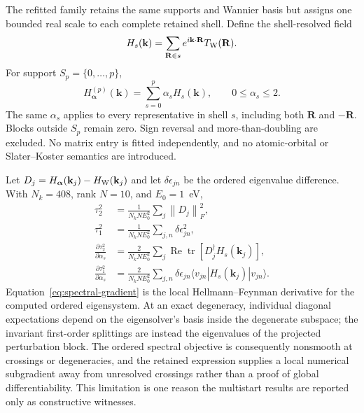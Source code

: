 \documentclass[11pt]{article}
\theoremstyle{definition}
\newcommand{\norm}[1]{\left\lVert#1\right\rVert}
\newcommand{\kvec}{\mathbf k}
\newcommand{\Rvec}{\mathbf R}
\begin{document}
The refitted family retains the same supports and Wannier basis but assigns one bounded
real scale to each complete retained shell.  Define the shell-resolved field
\begin{equation}
 H_s(\kvec)=\sum_{\Rvec\in s}e^{i\kvec\cdot\Rvec}T_{\rm W}(\Rvec).
 \label{eq:shell-field}
\end{equation}
For support $S_p=\{0,\ldots,p\}$,
\begin{equation}
 H_{\boldsymbol\alpha}^{(p)}(\kvec)
 =\sum_{s=0}^{p}\alpha_sH_s(\kvec),
 \qquad 0\le\alpha_s\le2.
 \label{eq:shell-refit}
\end{equation}
The same $\alpha_s$ applies to every representative in shell $s$, including both
$\Rvec$ and $-\Rvec$.  Blocks outside $S_p$ remain zero.  Sign reversal and
more-than-doubling are excluded.  No matrix entry is fitted independently, and no
atomic-orbital or Slater--Koster semantics are introduced.

Let $D_j=H_{\boldsymbol\alpha}(\kvec_j)-H_{\rm W}(\kvec_j)$ and let
$\delta\epsilon_{jn}$ be the ordered eigenvalue difference.  With $N_k=408$, rank
$N=10$, and $E_0=1$~eV,
\begin{align}
 \tau_2^2&=\frac{1}{N_kNE_0^2}\sum_j\norm{D_j}_F^2,\\
 \tau_1^2&=\frac{1}{N_kN E_0^2}\sum_{j,n}\delta\epsilon_{jn}^2,
 \label{eq:refit-losses}\\
 \frac{\partial\tau_2^2}{\partial\alpha_s}
 &=\frac{2}{N_kNE_0^2}\sum_j
 \operatorname{Re}\operatorname{tr}[D_j^\dagger H_s(\kvec_j)],
 \label{eq:operator-gradient}\\
 \frac{\partial\tau_1^2}{\partial\alpha_s}
 &=\frac{2}{N_kN E_0^2}\sum_{j,n}\delta\epsilon_{jn}
 \langle v_{jn}|H_s(\kvec_j)|v_{jn}\rangle.
 \label{eq:spectral-gradient}
\end{align}
Equation~\eqref{eq:spectral-gradient} is the local Hellmann--Feynman derivative for the
computed ordered eigensystem.  At an exact degeneracy, individual diagonal expectations
depend on the eigensolver's basis inside the degenerate subspace; the invariant
first-order splittings are instead the eigenvalues of the projected perturbation block.
The ordered spectral objective is consequently nonsmooth at crossings or degeneracies,
and the retained expression supplies a local numerical subgradient away from unresolved
crossings rather than a proof of global differentiability.  This limitation is one
reason the multistart results are reported only as constructive witnesses.
\end{document}
